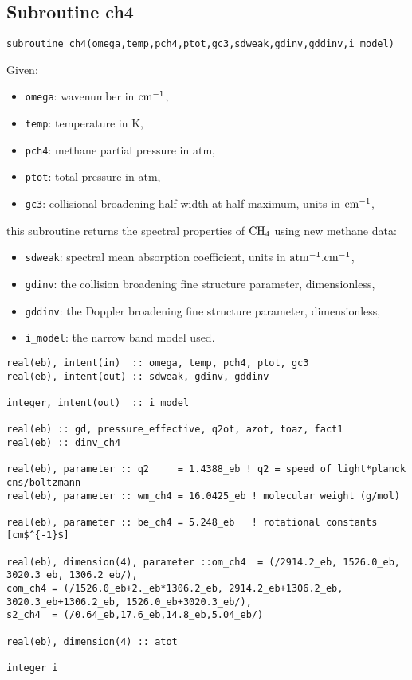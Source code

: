 \subsection{Subroutine ch4}
\label{sub:ch4}

\begin{lstlisting}
subroutine ch4(omega,temp,pch4,ptot,gc3,sdweak,gdinv,gddinv,i_model)
\end{lstlisting}
Given:
\begin{itemize}
 \item \verb=omega=: wavenumber in $\rm cm^{-1}$,
 \item \verb=temp=: temperature in K,
 \item \verb=pch4=: methane partial pressure in atm,
 \item \verb=ptot=: total pressure in atm,
 \item \verb=gc3=: collisional broadening half-width at half-maximum, units in $\rm cm^{-1}$,
\end{itemize}
this subroutine returns the spectral properties of $\rm CH_4$ using new methane data:
\begin{itemize}
 \item \verb=sdweak=: spectral mean absorption coefficient, units in $\rm atm^{-1}.cm^{-1}$,
 \item \verb=gdinv=: the collision broadening fine structure parameter, dimensionless,
 \item \verb=gddinv=: the Doppler broadening fine structure parameter, dimensionless,
 \item \verb=i_model=: the narrow band model used.
\end{itemize}

\begin{lstlisting}
real(eb), intent(in)  :: omega, temp, pch4, ptot, gc3
real(eb), intent(out) :: sdweak, gdinv, gddinv

integer, intent(out)  :: i_model

real(eb) :: gd, pressure_effective, q2ot, azot, toaz, fact1
real(eb) :: dinv_ch4

real(eb), parameter :: q2     = 1.4388_eb ! q2 = speed of light*planck cns/boltzmann
real(eb), parameter :: wm_ch4 = 16.0425_eb ! molecular weight (g/mol)

real(eb), parameter :: be_ch4 = 5.248_eb   ! rotational constants [cm$^{-1}$]

real(eb), dimension(4), parameter ::om_ch4  = (/2914.2_eb, 1526.0_eb, 3020.3_eb, 1306.2_eb/),
com_ch4 = (/1526.0_eb+2._eb*1306.2_eb, 2914.2_eb+1306.2_eb, 3020.3_eb+1306.2_eb, 1526.0_eb+3020.3_eb/),
s2_ch4  = (/0.64_eb,17.6_eb,14.8_eb,5.04_eb/)

real(eb), dimension(4) :: atot

integer i

\end{lstlisting}


